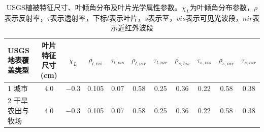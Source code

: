 \begin{landscape}
\begin{table}[htbp]
\centering
\caption[USGS植被特征尺寸、叶倾角分布及叶片光学属性参数]{USGS植被特征尺寸、叶倾角分布及叶片光学属性参数。$\chi_L$为叶倾角分布参数，$\rho$表示反射率，$\tau$表示透射率，下标$l$表示叶片，$s$表示茎，$vis$表示可见光波段，$nir$表示近红外波段}
\label{tab:USGS植被特征尺寸叶倾角分布及叶片光学属性参数1}
    \begin{tabular}{@{}lcccccccccc@{}}
    \toprule
    USGS地表覆盖类型     & 叶片特征尺寸(cm) & $\chi_L$ &$\rho_{l, vis}$ & $\tau_{l, vis}$  &$\rho_{l, nir}$ &$\tau_{l, nir}$ & $\rho_{s, vis}$ &$\tau_{s, vis}$ &$\rho_{s, nir}$ &$\tau_{s,nir}$\\ \midrule
    1 城市           & 4.0        & \num{ -0.3  }                                                                       & 0.105                                                                                                           & 0.07                                                                                                            & 0.58                                                                                                            & 0.25                                                                                                            & 0.36                                                                                                            & 0.22                                                                                                            & 0.58                                                                                                            & 0.38                                                                                                            \\
    2 干旱农田与牧场      & 4.0        & \num{ -0.3  }                                                                       & 0.105                                                                                                           & 0.07                                                                                                            & 0.58                                                                                                            & 0.25                                                                                                            & 0.36                                                                                                            & 0.22                                                                                                            & 0.58                                                                                                            & 0.38                                                                                                            \\

\end{tabular}
\end{table}
\end{landscape}
